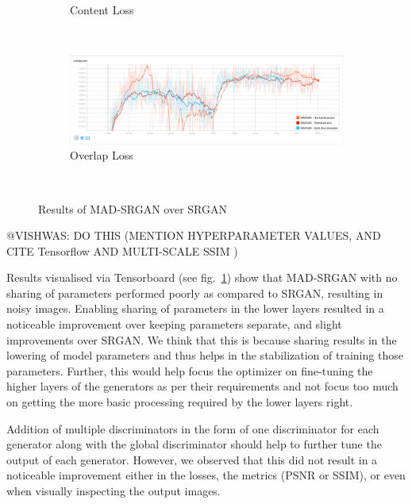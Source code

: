 \documentclass[12pt,a4paper,twocolumn]{article}
\begin{document}
\begin{figure}
\begin{subfigure}{0.48\textwidth}
                \caption{Content Loss}
            \end{subfigure}\\[5mm]
            \begin{subfigure}{0.48\textwidth}
                \includegraphics[width=\textwidth]{images/ovrl-loss.png}
                \caption{Overlap Loss}
            \end{subfigure}\\[2mm]
            \caption{Results of MAD-SRGAN over SRGAN}
            \label{fig:results}
        \end{figure}

        @VISHWAS: DO THIS (MENTION HYPERPARAMETER VALUES, AND CITE Tensorflow \cite{tensorflow} AND MULTI-SCALE SSIM \cite{msssim})

        Results visualised via Tensorboard \cite{tensorflow} (see fig.~\ref{fig:results}) show that MAD-SRGAN with no sharing of parameters performed poorly as compared to SRGAN, resulting in noisy images.
        Enabling sharing of parameters in the lower layers resulted in a noticeable improvement over keeping parameters separate, and slight improvements over SRGAN.
        We think that this is because sharing results in the lowering of model parameters and thus helps in the stabilization of training those parameters.
        Further, this would help focus the optimizer on fine-tuning the higher layers of the generators as per their requirements and not focus too much on getting the more basic processing required by the lower layers right.

        Addition of multiple discriminators in the form of one discriminator for each generator along with the global discriminator should help to further tune the output of each generator.
        However, we observed that this did not result in a noticeable improvement either in the losses, the metrics (PSNR or SSIM), or even when visually inspecting the output images.

\end{document}
